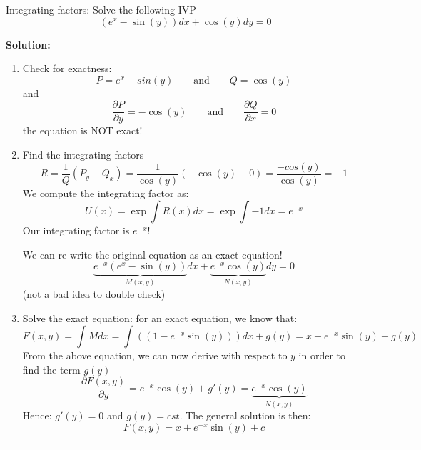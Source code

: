 \begin{exmp}{Integrating factors:}
Solve the following IVP
\begin{equation}
(e^x-\sin(y))dx+\cos(y)dy=0
\end{equation}

\textbf{Solution:}
\begin{enumerate}
\item Check for exactness: 
\begin{equation}
P=e^x-sin(y) \qquad \text{and} \qquad Q=\cos(y)
\end{equation}
and
\begin{equation}
\frac{\partial P}{\partial y}=-\cos(y)\qquad \text{and} \qquad \frac{\partial Q}{\partial x}=0
\end{equation}
the equation is NOT exact!
\item Find the integrating factors
\begin{equation}
R=\frac{1}{Q}\left(P_y-Q_x\right)=\frac{1}{\cos(y)}\left(-\cos(y)-0\right)=\frac{-cos(y)}{\cos(y)}=-1
\end{equation}
We compute the integrating factor as:
\begin{equation}
U(x)=\exp \int R(x)dx=\exp{\int -1 dx} =e^{-x}
\end{equation}
Our integrating factor is $e^{-x}$!

We can re-write the original equation as an exact equation!
\begin{equation}
\underbrace{e^{-x}(e^x-\sin(y))}_{M(x,y)}dx+\underbrace{e^{-x}\cos(y)}_{N(x,y)}dy=0
\end{equation}
(not a bad idea to double check)

\item Solve the exact equation: for an exact equation, we know that:
\begin{equation}
F(x,y)=\int M dx=  \int ((1-e^{-x}\sin(y))) dx+ g(y) = x+e^{-x}\sin(y)+g(y)
\end{equation}
From the above equation, we can now derive with respect to $y$ in order to find the term $g(y)$
\begin{equation}
\frac{\partial F(x,y)}{\partial y}= e^{-x}\cos(y)+g'(y) = \underbrace{e^{-x}\cos(y)}_{N(x,y)}
\end{equation}
Hence:  $g'(y)=0$ and $g(y)=cst$.
The general solution is then:
\begin{equation}
F(x,y)= x+e^{-x}\sin(y)+c
\end{equation}
\end{enumerate}
\end{exmp}
\begin{center}
\noindent\rule{4cm}{0.4pt}
\end{center}

\updateinfo[September 19, 2018]

